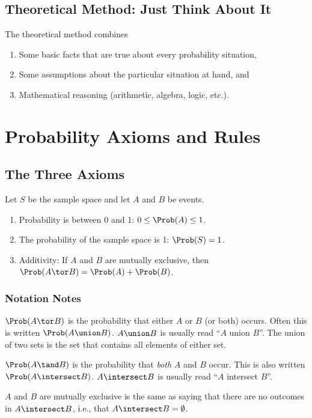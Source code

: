 \documentclass[twoside]{book}\usepackage[]{graphicx}\usepackage[]{xcolor}
\begin{document}
\subsection{Theoretical Method: Just Think About It}

The theoretical method combines
\begin{enumerate}
\item Some basic facts that are true about every probability situation,
\item Some assumptions about the particular situation at hand, and 
\item Mathematical reasoning (arithmetic, algebra, logic, etc.).
\end{enumerate}

\section{Probability Axioms and Rules}

\subsection{The Three Axioms}

Let $S$ be the sample space and let $A$ and $B$ be events.
\begin{enumerate}
\item Probability is between 0 and 1: $0 \le \Prob(A) \le 1$.
\item The probability of the sample space is 1: $\Prob(S) = 1$.
\item Additivity: 
If $A$ and $B$ are mutually exclusive, then 
$\Prob(A \tor B) = \Prob(A) + \Prob(B)$.
\end{enumerate}

\subsubsection{Notation Notes}
$\Prob(A \tor B)$ is the probability that either $A$ or $B$ (or both) 
occurs.  Often this is written $\Prob(A \union B)$.  $A \union B$ is usually read
``$A$ union $B$''.  The union of two sets is the set that contains all elements of either 
set.  

$\Prob(A \tand B)$ is the probability that \emph{both} $A$ and $B$ occur.
This is also written $\Prob (A \intersect B)$.  $A \intersect B$ is usually read
``$A$ intersect $B$''.  

$A$ and $B$ are mutually exclusive is the same as saying that there are no
outcomes in $A\intersect B$, i.e., that $A \intersect B = \emptyset$.
\end{document}
